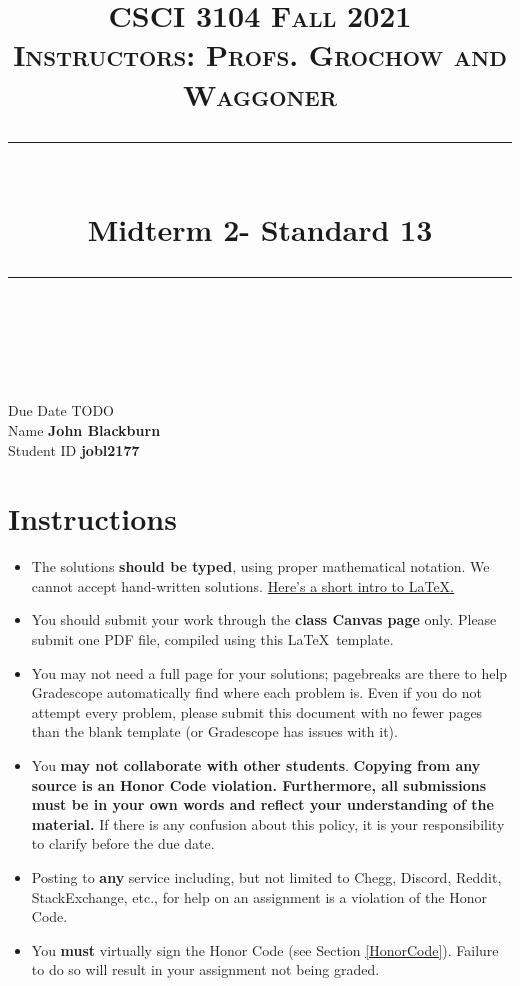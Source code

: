 \documentclass[11pt]{article}
\title{
\normalfont \normalsize 
\textsc{CSCI 3104 Fall 2021 \\ 
Instructors: Profs. Grochow and Waggoner} \\
[10pt] 
\rule{\linewidth}{0.5pt} \\[6pt] 
\huge Midterm 2- Standard 13 \\
\rule{\linewidth}{2pt}  \\[10pt]
}
\date{}
\theoremstyle{definition}
\theoremstyle{definition}
\theoremstyle{definition}
\begin{document}

\maketitle


\noindent
Due Date \dotfill TODO \\
Name \dotfill \textbf{John Blackburn} \\
Student ID \dotfill \textbf{jobl2177} \\


\tableofcontents

\section{Instructions}
 \begin{itemize}
	\item The solutions \textbf{should be typed}, using proper mathematical notation. We cannot accept hand-written solutions. \href{http://ece.uprm.edu/~caceros/latex/introduction.pdf}{Here's a short intro to \LaTeX.}
	\item You should submit your work through the \textbf{class Canvas page} only. Please submit one PDF file, compiled using this \LaTeX \ template.
	\item You may not need a full page for your solutions; pagebreaks are there to help Gradescope automatically find where each problem is. Even if you do not attempt every problem, please submit this document with no fewer pages than the blank template (or Gradescope has issues with it).

	\item You \textbf{may not collaborate with other students}. \textbf{Copying from any source is an Honor Code violation. Furthermore, all submissions must be in your own words and reflect your understanding of the material.} If there is any confusion about this policy, it is your responsibility to clarify before the due date. 

	\item Posting to \textbf{any} service including, but not limited to Chegg, Discord, Reddit, StackExchange, etc., for help on an assignment is a violation of the Honor Code.

	\item You \textbf{must} virtually sign the Honor Code (see Section \ref{HonorCode}). Failure to do so will result in your assignment not being graded.
\end{itemize}
\end{document}
